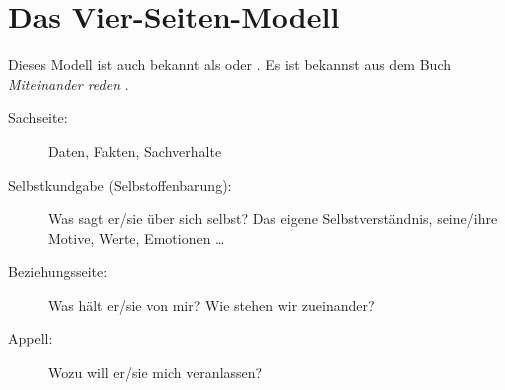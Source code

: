 \section{Das Vier-Seiten-Modell}

Dieses Modell ist auch bekannt als  oder . Es ist bekannst aus dem Buch \emph{Miteinander reden} \cite{miteinander-reden-1}.

\begin{description}
  \item[Sachseite:] Daten, Fakten, Sachverhalte
  \item[Selbstkundgabe (Selbstoffenbarung):] Was sagt er/sie über sich selbst? Das eigene Selbstverständnis, seine/ihre Motive, Werte, Emotionen \ldots
  \item[Beziehungsseite:] Was hält er/sie von mir? Wie stehen wir zueinander?
  \item[Appell:] Wozu will er/sie mich veranlassen?
\end{description}
